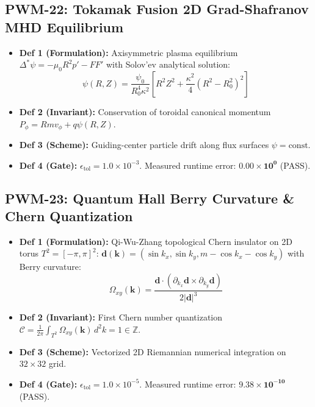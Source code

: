 \documentclass[10pt,journal,compsoc]{IEEEtran}
\theoremstyle{definition}
\begin{document}
\subsection{PWM-22: Tokamak Fusion 2D Grad-Shafranov MHD Equilibrium}
\begin{itemize}
    \item \textbf{Def 1 (Formulation):} Axisymmetric plasma equilibrium $\Delta^* \psi = -\mu_0 R^2 p' - F F'$ with Solov'ev analytical solution:
    \begin{equation}
    \psi(R, Z) = \frac{\psi_0}{R_0^4 \kappa^2} \left[ R^2 Z^2 + \frac{\kappa^2}{4} (R^2 - R_0^2)^2 \right]
    \end{equation}
    \item \textbf{Def 2 (Invariant):} Conservation of toroidal canonical momentum $P_\phi = R m v_\phi + q \psi(R, Z)$.
    \item \textbf{Def 3 (Scheme):} Guiding-center particle drift along flux surfaces $\psi = \text{const}$.
    \item \textbf{Def 4 (Gate):} $\epsilon_{\text{tol}} = 1.0 \times 10^{-3}$. Measured runtime error: $\mathbf{0.00 \times 10^0}$ (\checkmark PASS).
\end{itemize}

\subsection{PWM-23: Quantum Hall Berry Curvature \& Chern Quantization}
\begin{itemize}
    \item \textbf{Def 1 (Formulation):} Qi-Wu-Zhang topological Chern insulator on 2D torus $T^2 = [-\pi, \pi]^2$: $\mathbf{d}(\mathbf{k}) = (\sin k_x, \sin k_y, m - \cos k_x - \cos k_y)$ with Berry curvature:
    \begin{equation}
    \Omega_{xy}(\mathbf{k}) = \frac{\mathbf{d} \cdot (\partial_{k_x}\mathbf{d} \times \partial_{k_y}\mathbf{d})}{2 |\mathbf{d}|^3}
    \end{equation}
    \item \textbf{Def 2 (Invariant):} First Chern number quantization $\mathcal{C} = \frac{1}{2\pi} \int_{T^2} \Omega_{xy}(\mathbf{k}) \, d^2k = 1 \in \mathbb{Z}$.
    \item \textbf{Def 3 (Scheme):} Vectorized 2D Riemannian numerical integration on $32 \times 32$ grid.
    \item \textbf{Def 4 (Gate):} $\epsilon_{\text{tol}} = 1.0 \times 10^{-5}$. Measured runtime error: $\mathbf{9.38 \times 10^{-10}}$ (\checkmark PASS).
\end{itemize}
\end{document}
